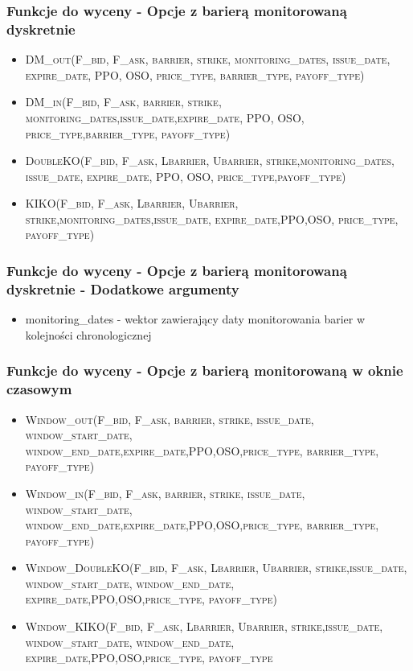 \documentclass{beamer}
\begin{document}
\begin{frame}
  \frametitle{Funkcje do wyceny - Opcje z barierą monitorowaną dyskretnie}

  \begin{itemize}
  \item \small \textsc{DM\_out(F\_bid, F\_ask, barrier, strike, monitoring\_dates, issue\_date, expire\_date, PPO, OSO, price\_type, barrier\_type, payoff\_type)}
  \item \small \textsc{DM\_in(F\_bid, F\_ask, barrier, strike, monitoring\_dates,issue\_date,expire\_date, PPO, OSO, price\_type,barrier\_type, payoff\_type)}
  \item \small \textsc{DoubleKO(F\_bid, F\_ask, Lbarrier, Ubarrier, strike,monitoring\_dates, issue\_date, expire\_date, PPO, OSO, price\_type,payoff\_type)}
  \item \small \textsc{KIKO(F\_bid, F\_ask, Lbarrier, Ubarrier, strike,monitoring\_dates,issue\_date, expire\_date,PPO,OSO, price\_type, payoff\_type)}
  \end{itemize}

\end{frame}



\begin{frame}
  \frametitle{Funkcje do wyceny - Opcje z barierą monitorowaną dyskretnie - Dodatkowe argumenty}

\begin{itemize}
\item monitoring\_dates - wektor zawierający daty monitorowania barier w kolejności chronologicznej
\end{itemize}

\end{frame}



\begin{frame}
  \frametitle{Funkcje do wyceny - Opcje z barierą monitorowaną w oknie czasowym}
  \begin{itemize}
  \item \small \textsc{Window\_out(F\_bid, F\_ask, barrier, strike, issue\_date, window\_start\_date, window\_end\_date,expire\_date,PPO,OSO,price\_type, barrier\_type, payoff\_type)}
  \item \small \textsc{Window\_in(F\_bid, F\_ask, barrier, strike, issue\_date, window\_start\_date, window\_end\_date,expire\_date,PPO,OSO,price\_type, barrier\_type, payoff\_type)
}
  \item \small \textsc{Window\_DoubleKO(F\_bid, F\_ask, Lbarrier, Ubarrier, strike,issue\_date, window\_start\_date, window\_end\_date, expire\_date,PPO,OSO,price\_type, payoff\_type)}
  \item \small \textsc{Window\_KIKO(F\_bid, F\_ask, Lbarrier, Ubarrier, strike,issue\_date, window\_start\_date, window\_end\_date, expire\_date,PPO,OSO,price\_type, payoff\_type}

  \end{itemize}
\end{frame}
\end{document}
